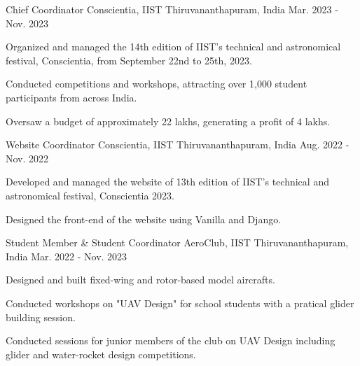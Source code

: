 

\begin{cventries}

  \cventry
  {Chief Coordinator} %
  {Conscientia, IIST} %
  {Thiruvananthapuram, India} %
  {Mar. 2023 - Nov. 2023} %
  {
    \begin{cvitems} %
      \item {Organized and managed the 14th edition of IIST's technical and astronomical festival, Conscientia, from September 22nd to 25th, 2023.}
      \item {Conducted competitions and workshops, attracting over 1,000 student participants from across India.}
      \item {Oversaw a budget of approximately 22 lakhs, generating a profit of 4 lakhs.}
    \end{cvitems}
  }

  \cventry
  {Website Coordinator} %
  {Conscientia, IIST} %
  {Thiruvananthapuram, India} %
  {Aug. 2022 - Nov. 2022} %
  {
    \begin{cvitems} %
      \item {Developed and managed the website of 13th edition of IIST's technical and astronomical festival, Conscientia 2023.}
      \item {Designed the front-end of the website using Vanilla and Django.}
    \end{cvitems}
  }

  \cventry
  {Student Member \& Student Coordinator} %
  {AeroClub, IIST} %
  {Thiruvananthapuram, India} %
  {Mar. 2022 - Nov. 2023} %
  {
    \begin{cvitems} %
      \item {Designed and built fixed-wing and rotor-based model aircrafts.}
      \item {Conducted workshops on "UAV Design" for school students with a pratical glider building session.}
      \item {Conducted sessions for junior members of the club on UAV Design including glider and water-rocket design competitions.}
    \end{cvitems}
  }
\end{cventries}

